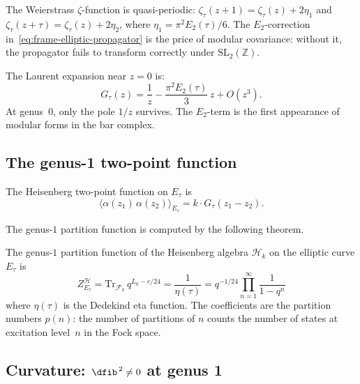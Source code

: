 The Weierstrass $\zeta$-function is quasi-periodic:
$\zeta_\tau(z + 1) = \zeta_\tau(z) + 2\eta_1$ and
$\zeta_\tau(z + \tau) = \zeta_\tau(z) + 2\eta_2$, where
$\eta_1 = \pi^2 E_2(\tau)/6$. The $E_2$-correction
in~\eqref{eq:frame-elliptic-propagator} is the price of modular
covariance: without it, the propagator fails to transform correctly
under $\mathrm{SL}_2(\mathbb{Z})$.

The Laurent expansion near $z = 0$ is:
\begin{equation}\label{eq:frame-green-laurent}
G_\tau(z) = \frac{1}{z}
- \frac{\pi^2 E_2(\tau)}{3}\, z + O(z^3).
\end{equation}
At genus~$0$, only the pole $1/z$ survives. The $E_2$-term
is the first appearance of modular forms in the bar complex.

\subsection{The genus-1 two-point function}

The Heisenberg two-point function on $E_\tau$ is
\begin{equation}\label{eq:frame-genus1-2pt}
\langle \alpha(z_1)\, \alpha(z_2) \rangle_{E_\tau}
= k \cdot G_\tau(z_1 - z_2).
\end{equation}

The genus-$1$ partition function is computed by the following theorem.

\begin{theorem}\label{thm:genus1-heisenberg}
The genus-$1$ partition function of the Heisenberg algebra $\mathcal{H}_k$ on the elliptic curve $E_\tau$ is
\begin{equation}\label{eq:frame-partition-g1}
Z_{E_\tau}^{\mathcal{H}} =
\mathrm{Tr}_{\mathcal{F}_k}\, q^{L_0 - c/24}
= \frac{1}{\eta(\tau)}
= q^{-1/24}\prod_{n=1}^{\infty}\frac{1}{1-q^n}
\end{equation}
where $\eta(\tau)$ is the Dedekind eta function. The coefficients
are the partition numbers $p(n)$: the number of partitions of $n$
counts the number of states at excitation level~$n$ in the
Fock space.
\end{theorem}

\subsection{\texorpdfstring{Curvature: $\dfib^{\,2} \neq 0$ at genus 1}{Curvature: d fib squared is not zero at genus 1}}

